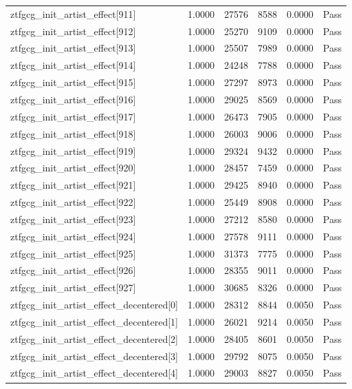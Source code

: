 \begin{table}[htbp]
\begin{tabular}{llrrll}
ztfgcg\_init\_artist\_effect[911] & 1.0000 & 27576 & 8588 & 0.0000 & Pass \\
ztfgcg\_init\_artist\_effect[912] & 1.0000 & 25270 & 9109 & 0.0000 & Pass \\
ztfgcg\_init\_artist\_effect[913] & 1.0000 & 25507 & 7989 & 0.0000 & Pass \\
ztfgcg\_init\_artist\_effect[914] & 1.0000 & 24248 & 7788 & 0.0000 & Pass \\
ztfgcg\_init\_artist\_effect[915] & 1.0000 & 27297 & 8973 & 0.0000 & Pass \\
ztfgcg\_init\_artist\_effect[916] & 1.0000 & 29025 & 8569 & 0.0000 & Pass \\
ztfgcg\_init\_artist\_effect[917] & 1.0000 & 26473 & 7905 & 0.0000 & Pass \\
ztfgcg\_init\_artist\_effect[918] & 1.0000 & 26003 & 9006 & 0.0000 & Pass \\
ztfgcg\_init\_artist\_effect[919] & 1.0000 & 29324 & 9432 & 0.0000 & Pass \\
ztfgcg\_init\_artist\_effect[920] & 1.0000 & 28457 & 7459 & 0.0000 & Pass \\
ztfgcg\_init\_artist\_effect[921] & 1.0000 & 29425 & 8940 & 0.0000 & Pass \\
ztfgcg\_init\_artist\_effect[922] & 1.0000 & 25449 & 8908 & 0.0000 & Pass \\
ztfgcg\_init\_artist\_effect[923] & 1.0000 & 27212 & 8580 & 0.0000 & Pass \\
ztfgcg\_init\_artist\_effect[924] & 1.0000 & 27578 & 9111 & 0.0000 & Pass \\
ztfgcg\_init\_artist\_effect[925] & 1.0000 & 31373 & 7775 & 0.0000 & Pass \\
ztfgcg\_init\_artist\_effect[926] & 1.0000 & 28355 & 9011 & 0.0000 & Pass \\
ztfgcg\_init\_artist\_effect[927] & 1.0000 & 30685 & 8326 & 0.0000 & Pass \\
ztfgcg\_init\_artist\_effect\_decentered[0] & 1.0000 & 28312 & 8844 & 0.0050 & Pass \\
ztfgcg\_init\_artist\_effect\_decentered[1] & 1.0000 & 26021 & 9214 & 0.0050 & Pass \\
ztfgcg\_init\_artist\_effect\_decentered[2] & 1.0000 & 28405 & 8601 & 0.0050 & Pass \\
ztfgcg\_init\_artist\_effect\_decentered[3] & 1.0000 & 29792 & 8075 & 0.0050 & Pass \\
ztfgcg\_init\_artist\_effect\_decentered[4] & 1.0000 & 29003 & 8827 & 0.0050 & Pass \\

\end{tabular}
\end{table}
